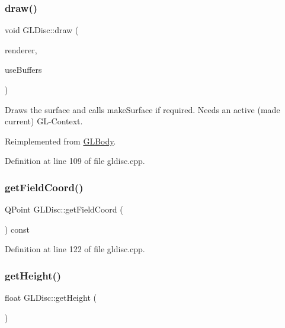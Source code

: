 \subsubsection{\texorpdfstring{draw()}{draw()}}
{\footnotesize\ttfamily void G\+L\+Disc\+::draw (\begin{DoxyParamCaption}\item[{\mbox{\hyperlink{class_g_l_e_s_renderer}{G\+L\+E\+S\+Renderer}} $\ast$}]{renderer,  }\item[{bool}]{use\+Buffers }\end{DoxyParamCaption})\hspace{0.3cm}{\ttfamily [virtual]}}

Draws the surface and calls make\+Surface if required. Needs an active (made current) G\+L-\/\+Context. 

Reimplemented from \mbox{\hyperlink{class_g_l_body_aaeb47c0a8cfc36caed81fc139c42ddfc}{G\+L\+Body}}.



Definition at line 109 of file gldisc.\+cpp.

\mbox{\label{class_g_l_disc_aa26416ba9591aa2d86b30b663e67a1a8}} 
\subsubsection{\texorpdfstring{getFieldCoord()}{getFieldCoord()}}
{\footnotesize\ttfamily Q\+Point G\+L\+Disc\+::get\+Field\+Coord (\begin{DoxyParamCaption}{ }\end{DoxyParamCaption}) const}



Definition at line 122 of file gldisc.\+cpp.

\mbox{\label{class_g_l_disc_a4cc6514312b042f1af87a5ce92bf1f71}} 
\subsubsection{\texorpdfstring{getHeight()}{getHeight()}}
{\footnotesize\ttfamily float G\+L\+Disc\+::get\+Height (\begin{DoxyParamCaption}{ }\end{DoxyParamCaption})\hspace{0.3cm}{\ttfamily [inline]}}



